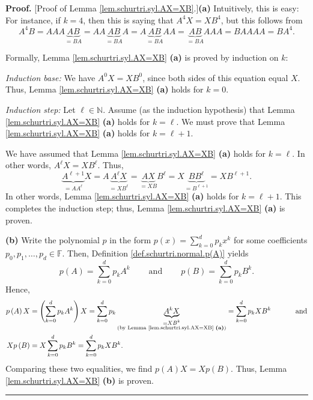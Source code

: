 \documentclass[numbers=enddot,12pt,final,onecolumn,notitlepage]{scrartcl}%
\numberwithin{exer}{subsection}
\theoremstyle{definition}
\newenvironment{proof}[1][Proof]{\noindent\textbf{#1.} }{\ \rule{0.5em}{0.5em}}
\let\sumnonlimits\sum
\renewcommand{\sum}{\sumnonlimits\limits}
\begin{document}
\begin{proof}
[Proof of Lemma \ref{lem.schurtri.syl.AX=XB}.]\textbf{(a)} Intuitively, this
is easy: For instance, if $k=4$, then this is saying that $A^{4}X=XB^{4}$, but
this follows from
\[
A^{4}B=AAA\underbrace{AB}_{=BA}=AA\underbrace{AB}_{=BA}A=A\underbrace{AB}%
_{=BA}AA=\underbrace{AB}_{=BA}AAA=BAAAA=BA^{4}.
\]


Formally, Lemma \ref{lem.schurtri.syl.AX=XB} \textbf{(a)} is proved by
induction on $k$:

\textit{Induction base:} We have $A^{0}X=XB^{0}$, since both sides of this
equation equal $X$. Thus, Lemma \ref{lem.schurtri.syl.AX=XB} \textbf{(a)}
holds for $k=0$.

\textit{Induction step:} Let $\ell\in\mathbb{N}$. Assume (as the induction
hypothesis) that Lemma \ref{lem.schurtri.syl.AX=XB} \textbf{(a)} holds for
$k=\ell$. We must prove that Lemma \ref{lem.schurtri.syl.AX=XB} \textbf{(a)}
holds for $k=\ell+1$.

We have assumed that Lemma \ref{lem.schurtri.syl.AX=XB} \textbf{(a)} holds for
$k=\ell$. In other words, $A^{\ell}X=XB^{\ell}$. Thus,%
\[
\underbrace{A^{\ell+1}}_{=AA^{\ell}}X=A\underbrace{A^{\ell}X}_{=XB^{\ell}%
}=\underbrace{AX}_{=XB}B^{\ell}=X\underbrace{BB^{\ell}}_{=B^{\ell+1}}%
=XB^{\ell+1}.
\]
In other words, Lemma \ref{lem.schurtri.syl.AX=XB} \textbf{(a)} holds for
$k=\ell+1$. This completes the induction step; thus, Lemma
\ref{lem.schurtri.syl.AX=XB} \textbf{(a)} is proven. \medskip

\textbf{(b)} Write the polynomial $p$ in the form $p\left(  x\right)
=\sum_{k=0}^{d}p_{k}x^{k}$ for some coefficients $p_{0},p_{1},\ldots,p_{d}%
\in\mathbb{F}$. Then, Definition \ref{def.schurtri.normal.p(A)} yields%
\[
p\left(  A\right)  =\sum_{k=0}^{d}p_{k}A^{k}\ \ \ \ \ \ \ \ \ \ \text{and}%
\ \ \ \ \ \ \ \ \ \ p\left(  B\right)  =\sum_{k=0}^{d}p_{k}B^{k}.
\]
Hence,%
\begin{align*}
p\left(  A\right)  X  &  =\left(  \sum_{k=0}^{d}p_{k}A^{k}\right)
X=\sum_{k=0}^{d}p_{k}\underbrace{A^{k}X}_{\substack{=XB^{k}\\\text{(by Lemma
\ref{lem.schurtri.syl.AX=XB} \textbf{(a)})}}}=\sum_{k=0}^{d}p_{k}%
XB^{k}\ \ \ \ \ \ \ \ \ \ \text{and}\\
Xp\left(  B\right)   &  =X\sum_{k=0}^{d}p_{k}B^{k}=\sum_{k=0}^{d}p_{k}XB^{k}.
\end{align*}
Comparing these two equalities, we find $p\left(  A\right)  X=Xp\left(
B\right)  $. Thus, Lemma \ref{lem.schurtri.syl.AX=XB} \textbf{(b)} is proven.
\end{proof}
\end{document}
